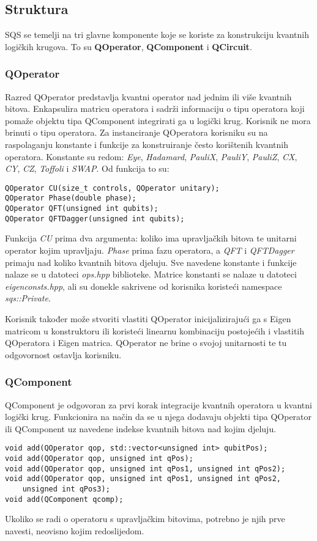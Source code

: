 \subsection{Struktura}

SQS se temelji na tri glavne komponente koje se koriste za konstrukciju kvantnih logičkih krugova. To su \textbf{QOperator}, \textbf{QComponent} i \textbf{QCircuit}.

\subsubsection{QOperator}
Razred QOperator predstavlja kvantni operator nad jednim ili više kvantnih bitova. Enkapsulira matricu operatora i sadrži informaciju o tipu operatora koji pomaže objektu tipa QComponent integrirati ga u logički krug. Korisnik ne mora brinuti o tipu operatora. Za instanciranje QOperatora korisniku su na raspolaganju konstante i funkcije za konstruiranje često korištenih kvantnih operatora. Konstante su redom: \textit{Eye}, \textit{Hadamard}, \textit{PauliX}, \textit{PauliY}, \textit{PauliZ}, \textit{CX}, \textit{CY}, \textit{CZ}, \textit{Toffoli} i \textit{SWAP}. Od funkcija to su:
\lstset{language=c++, tabsize=2}
\begin{lstlisting}
QOperator CU(size_t controls, QOperator unitary);
QOperator Phase(double phase);
QOperator QFT(unsigned int qubits);
QOperator QFTDagger(unsigned int qubits);
\end{lstlisting}
Funkcija \textit{CU} prima dva argumenta: koliko ima upravljačkih bitova te unitarni operator kojim upravljaju. \textit{Phase} prima fazu operatora, a \textit{QFT} i \textit{QFTDagger} primaju nad koliko kvantnih bitova djeluju. Sve navedene konstante i funkcije nalaze se u datoteci \emph{ops.hpp} biblioteke. Matrice konstanti se nalaze u datoteci \emph{eigenconsts.hpp}, ali su donekle sakrivene od korisnika koristeći namespace \emph{sqs::Private}.

Korisnik također može stvoriti vlastiti QOperator inicijalizirajući ga s Eigen matricom u konstruktoru ili koristeći linearnu kombinaciju postojećih i vlastitih QOperatora i Eigen matrica. QOperator ne brine o svojoj unitarnosti te tu odgovornost ostavlja korisniku.

\subsubsection{QComponent}

QComponent je odgovoran za prvi korak integracije kvantnih operatora u kvantni logički krug. Funkcionira na način da se u njega dodavaju objekti tipa QOperator ili QComponent uz navedene indekse kvantnih bitova nad kojim djeluju.
\begin{lstlisting}
void add(QOperator qop, std::vector<unsigned int> qubitPos);
void add(QOperator qop, unsigned int qPos);
void add(QOperator qop, unsigned int qPos1, unsigned int qPos2);
void add(QOperator qop, unsigned int qPos1, unsigned int qPos2,
	unsigned int qPos3);
void add(QComponent qcomp);
\end{lstlisting}
Ukoliko se radi o operatoru s upravljačkim bitovima, potrebno je njih prve navesti, neovisno kojim redoslijedom.

